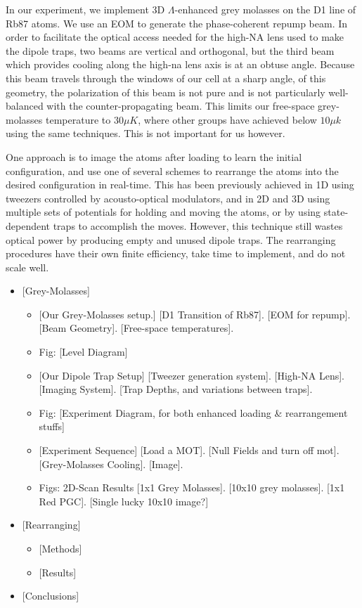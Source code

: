 \documentclass[aps,prl,amsmath,amssymb,groupedaddress,10pt,superscriptaddress,floatfix,twocolumn,showkeys,longbibliography]{revtex4-1} %
\begin{document}
In our experiment, we implement 3D $\Lambda$-enhanced grey molasses on the D1 line of Rb87 atoms. We use an EOM to generate the phase-coherent repump beam. In order to facilitate the optical access needed for the high-NA lens used to make the dipole traps, two beams are vertical and orthogonal, but the third beam which provides cooling along the high-na lens axis is at an obtuse angle. Because this beam travels through the windows of our cell at a sharp angle, of this geometry, the polarization of this beam is not pure and is not particularly well-balanced with the counter-propagating beam. This limits our free-space grey-molasses temperature to $30\mu K$, where other groups have achieved below $10\mu k$ using the same techniques. This is not important for us however.

One approach is to image the atoms after loading to learn the initial configuration, and use one of several schemes to rearrange the atoms into the desired configuration in real-time. This has been previously achieved in 1D using tweezers controlled by acousto-optical modulators, and in 2D and 3D using multiple sets of potentials for holding and moving the atoms, or by using state-dependent traps to accomplish the moves. However, this technique still wastes optical power by producing empty and unused dipole traps. The rearranging procedures have their own finite efficiency, take time to implement, and do not scale well.

\begin{itemize}
\item{[Grey-Molasses]}
    \begin{itemize}    
    \item{[Our Grey-Molasses setup.]}
        [D1 Transition of Rb87]. [EOM for repump]. [Beam Geometry]. [Free-space temperatures].
    \item{Fig: [Level Diagram]}
    \item{[Our Dipole Trap Setup]}
        [Tweezer generation system]. [High-NA Lens].  [Imaging System].  [Trap Depths, and variations between traps].
    \item{Fig: [Experiment Diagram, for both enhanced loading \& rearrangement stuffs]}
    
    \item{[Experiment Sequence]}
        [Load a MOT]. [Null Fields and turn off mot]. [Grey-Molasses Cooling]. [Image].
    
    \item{Figs: 2D-Scan Results}
        [1x1 Grey Molasses]. [10x10 grey molasses]. [1x1 Red PGC]. [Single lucky 10x10 image?]
    \end{itemize}
\item{[Rearranging]}
    \begin{itemize}
    \item{[Methods]}
    \item{[Results]}
    \end{itemize}
\item{[Conclusions]}

\end{itemize}
\end{document}

